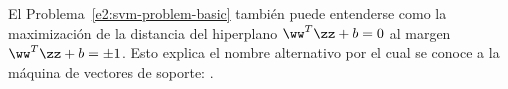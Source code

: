 El Problema~\ref{e2:svm-problem-basic} también puede entenderse como
la maximización de la distancia del hiperplano $\ww^T\zz+b=0$ al
margen $\ww^T\zz+b=\pm1$.
Esto explica el nombre alternativo por el cual se conoce a la máquina
de vectores de soporte: .

